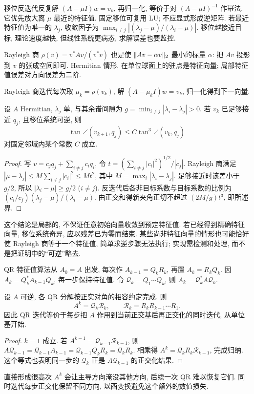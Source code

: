 移位反迭代反复解 $(A-\mu I)w=v_k$, 再归一化, 等价于对 $(A-\mu I)^{-1}$ 作幂法. 它优先放大离 $\mu$ 最近的特征值. 固定移位可复用 LU; 不应显式形成逆矩阵. 若最近特征值为唯一的 $\lambda_j$, 收敛因子为
$\max_{i\ne j}|(\lambda_j-\mu)/(\lambda_i-\mu)|$.
移位越接近目标, 理论速度越快, 但线性系统更病态, 求解误差也要监控.

Rayleigh 商 $\rho(v)=v^*Av/(v^*v)$ 也是使 $\lVert Av-\alpha v\rVert_2$ 最小的标量 $\alpha$: 把 $Av$ 投影到 $v$ 的张成空间即可. Hermitian 情形, 在单位球面上的驻点是特征向量; 局部特征值误差对方向误差为二阶.

Rayleigh 商迭代每次取 $\mu_k=\rho(v_k)$, 解 $(A-\mu_kI)w=v_k$, 归一化得到下一向量.
\begin{proposition}[局部三次收敛]
设 $A$ Hermitian, $\lambda_j$ 单, 与其余谱间隙为 $g=\min_{i\ne j}|\lambda_i-\lambda_j|>0$. 若 $v_k$ 已足够接近 $q_j$, 且移位系统可逆, 则
\[
\tan\angle(v_{k+1},q_j)\le C\tan^3\angle(v_k,q_j)
\]
对固定邻域内某个常数 $C$ 成立.
\end{proposition}
\begin{proof}
写 $v=c_jq_j+\sum_{i\ne j}c_iq_i$, 令 $t=(\sum_{i\ne j}|c_i|^2)^{1/2}/|c_j|$. Rayleigh 商满足
$|\mu-\lambda_j|\le M\sum_{i\ne j}|c_i|^2\le Mt^2$,
其中 $M=\max_i|\lambda_i-\lambda_j|$. 足够接近时该差小于 $g/2$, 所以 $|\lambda_i-\mu|\ge g/2$ ($i\ne j$). 反迭代后各非目标系数与目标系数的比例为
$ (c_i/c_j)(\lambda_j-\mu)/(\lambda_i-\mu)$.
由正交和得新夹角正切不超过 $(2M/g)t^3$, 即所述界.
\end{proof}
这个结论是局部的, 不保证任意初始向量收敛到预定特征值. 若已经得到精确特征向量, 移位系统奇异, 应以残差已为零而结束. 某些尚非特征向量的情形也可能恰好使 Rayleigh 商等于一个特征值, 简单求逆步骤无法执行; 实现需检测和处理, 而不是把证明中的“可逆”略去.

QR 特征值算法从 $A_0=A$ 出发, 每次作 $A_{k-1}=Q_kR_k$, 再置 $A_k=R_kQ_k$. 因 $A_k=Q_k^*A_{k-1}Q_k$, 每一步保持特征值. 令 $\mathcal Q_k=Q_1\cdots Q_k$, 则 $A_k=\mathcal Q_k^*A\mathcal Q_k$.

\begin{proposition}\label{prop:qriter}
设 $A$ 可逆, 各 QR 分解按正实对角的相容约定完成. 则
\[
A^k=\mathcal Q_k\mathcal R_k,\qquad
\mathcal R_k=R_kR_{k-1}\cdots R_1.
\]
因此 QR 迭代等价于每步把 $A$ 作用到当前正交基后再正交化的同时迭代, 从单位基开始.
\end{proposition}
\begin{proof}
$k=1$ 成立. 若 $A^{k-1}=\mathcal Q_{k-1}\mathcal R_{k-1}$, 则
$A\mathcal Q_{k-1}=\mathcal Q_{k-1}A_{k-1}=\mathcal Q_{k-1}Q_kR_k=\mathcal Q_kR_k$.
相乘得 $A^k=\mathcal Q_kR_k\mathcal R_{k-1}$, 完成归纳. 这个等式也表明同一步的 $\mathcal Q_k$ 正是 $A\mathcal Q_{k-1}$ 的正交化结果.
\end{proof}
直接形成很高次 $A^k$ 会让主导方向淹没其他方向, 后续一次 QR 难以恢复它们. 同时迭代每步正交化保留不同方向, 以酉变换避免这个额外的数值损失.

